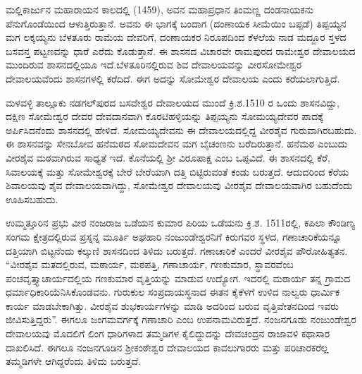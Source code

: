 ಮಲ್ಲಿಕಾರ್ಜುನ ಮಹಾರಾಯನ ಕಾಲದಲ್ಲಿ (1459), ಅವನ ಮಹಾಪ್ರಧಾನ ತಿಂಮಣ್ಣ ದಂಡನಾಯಕನು ಪೆನುಗೊಂಡೆಯಿಂದ ಆಳುತ್ತಿರುತ್ತಾನೆ. ಅವನು ಈ ಭಾಗಕ್ಕೆ ಬಂದಾಗ (ದಂಣಾಯಕ ಸೀಮೆಯಿಂ ಬಪ್ಪಡೆ) ತಿಪ್ಪಯ್ಯನ ಮಗ ಲಕ್ಕಯ್ಯನು ಬೆಳತೂರು ರಾಮೆಯ ದೇವರಿಗೆ, ದಂಣಾಯಕರ ನಿರೂಪದಿಂದ ಕೆಳಲೆಯ ನಾಡ ಮದ್ದೂರ ಸ್ತಳದ ಬಸವನ್ತ ಪಟ್ಟಣವನ್ನು ಧಾರೆ ಎರೆದು ಕೊಡುತ್ತಾನೆ. ಈ ಶಾಸನದ ವಿಚಾರವೇ ರಾಮಪುರದ ರಾಮೇಶ್ವರ ದೇವಾಲಯದ ಮುಂದಿರುವ ಶಾಸನದಲ್ಲಿಯೂ ಇದೆ.ಬೆಳತೂರಿನಲ್ಲಿರುವ ಶಿವ ದೇವಾಲಯವನ್ನು ವೀರಸೋಮೇಶ್ವರ ದೇವಾಲಯವೆಂದು ಶಾಸನಗಳಲ್ಲಿ ಕರೆದಿದೆ. ಈಗ ಅದನ್ನು ಸೋಮೇಶ್ವರ ದೇವಾಲಯ ಎಂದು ಕರೆಯಲಾಗುತ್ತಿದೆ.

ಮಳವಳ್ಳಿ ತಾಲ್ಲೂಕು ನಡಗಲ್​ಪುರದ ಬಸವೇಶ್ವರ ದೇವಾಲಯದ ಮುಂದೆ ಕ್ರಿ.ಶ.1510 ರ ಒಂದು ಶಾಸನವಿದ್ದು, ದಕ್ಷಿಣ ಸೋಮೇಶ್ವರ ದೇವರ ದೇವದಾನವಾಗಿ ಕೊರಟಿಹಳ್ಳಿಯನ್ನು ತಿಪ್ಪಯ್ಯನು ಸೋಮಯ್ಯದೇವರ ಪಾದಕ್ಕೆ ಅರ್ಪಿಸಿದನೆಂದು ಶಾಸನದಲ್ಲಿ ಹೇಳಿದೆ. ಸೋಮಯ್ಯದೇವನು ಈ ದೇವಾಲಯದಲ್ಲಿದ್ದ ವೀರಶೈವ ಗುರುವಾಗಿರಬಹುದು. ಈ ಶಾಸನವನ್ನು ಸೇನಬೋವ ಹನೆಮಠದ ಸೋಮದೇವನ ಮಗ ಬೈಚಂಣನು ಬರೆದಿರುತ್ತಾನೆ. ಹನೆಮಠ ಎಂಬುದು ವೀರಶೈವ ಮಠವಾಗಿರುವ ಸಾಧ್ಯತೆ ಇದೆ. ಕೊನೆಯಲ್ಲಿ ಶ‍್ರೀ ವಿರೂಪಾಕ್ಷ ಎಂಬ ಒಪ್ಪವಿದೆ. ಈ ಶಾಸನದಲ್ಲಿ ಕೆರೆ, ಸಿವಾಲಯಕ್ಕೆ ಮತ್ತು ಸೋಮೇಶ್ವರಕ್ಕೆ ಬೇರೆ ಬೇರೆಯಾಗಿ ದತ್ತಿ ಬಿಟ್ಟಿರುವಂತೆ ಕಂಡು ಬರುತ್ತದೆ. ಆದುದರಿಂದ ಕೆರೆಯ ಶಿವಾಲಯವು ಶೈವ ದೇವಾಲಯವಾಗಿದ್ದು, ಸೋಮೇಶ್ವರ ದೇವಾಲಯವು ವೀರಶೈವ ದೇವಾಲಯವಾಗಿರ ಬಹುದೆಂದು ಊಹಿಸಬಹುದು.

ಉಮ್ಮತ್ತೂರಿನ ಪ್ರಭು ವೀರ ನಂಜರಾಜ ಒಡೆಯನ ಕುಮಾರ ಪಿರಿಯ ಒಡೆಯನು ಕ್ರಿ.ಶ. 1511ರಲ್ಲಿ, ಕಪಿಲಾ ಕೌಂಡಿಣ್ಯ ಸಂಗಮ ಕ್ಷೇತ್ರದಲ್ಲಿರುವ ಪ್ರಸ್ನನ್ನ ಮೂರ್ತಿ ಅಘಹಾರಿ ನಂಜುಂಡೇಶ್ವರನಿಗೆ ಕಿರುಗವರ ಸ್ಥಳದ, ಗಣಾಚಾರಿಕೆಯನ್ನೂ ದತ್ತಿಯಾಗಿ ಬಿಟ್ಟನೆಂದು ಕಲ್ಕುಣಿ ಶಾಸನದಿಂದ ತಿಳಿದು ಬರುತ್ತದೆ. ಗಣಾಚಾರಿಕೆ ಎಂದರೆ ವೀರಶೈವ ಪೌರೋಹಿತ್ಯತನ. “ವೀರಶೈವ ಮತದಲ್ಲಿರುವ, ಮಠಾರ್ಯ, ಮಠಪತ್ತಿ, ಗಣಾಚಾರ್ಯ, ಗಣಕುಮಾರ, ಸ್ಥಾವರವೆಂಬ ಪಂಚವೃತ್ತ್ಯಾಚಾರ್ಯ\-ದಲ್ಲಿಯ ಗಣಕುಮಾರ ವೃತ್ತಿಯನ್ನು ಮಾಡುವ ಉದ್ಯೋಗ. ಇದರಲ್ಲಿ ಮಠಾರ್ಯ ತನ್ನ ಗ್ರಾಮದ ಧರ್ಮಾಧಿಕಾರಿಯೆನಿಸಿ\-ಕೊಂಡವನು. ಗುರುಕುಲ ಸಂಪ್ರದಾಯಸ್ಥನಾದ ಈತನ ಕೈಕೆಳಗೆ ಉಳಿದ ನಾಲ್ವರು ಧಾರ್ಮಿಕ ಕಾರ್ಯ ಮಾಡಬೇಕಾಗಿತ್ತು. ವೀರಶೈವ ಶುಭಕಾರ್ಯಗಳನ್ನು ಮಾಡಿ ಅದರಿಂದ ಬರುವ ವೃತ್ತಿವೇತನದಿಂದ ಇವರು ಜೀವಿಸುತ್ತಿದ್ದರು”. ಈಗಲೂ ಜಂಗಮವರ್ಗಕ್ಕೆ ಗಣಾಚಾರಿ ಎಂಬ ಉಪನಾಮವಿರುತ್ತದೆ. ನಂಜನಗೂಡು ನಂಜುಂಡೇಶ್ವರ ದೇವಾಲಯವು ಮೊದಲಿಗೆ ಲಿಂಗ ಧಾರಿಗಳಾದ ತಮ್ಮಡಿಗಳ ಕೈಲಿದ್ದುದನ್ನು ದೇವಚಂದ್ರನ ರಾಜಾವಳಿ ಕಥಾಸಾರ ದಾಖಲಿಸಿದೆ. ಈಗಲೂ ನಂಜನಗೂಡಿನ ಶ‍್ರೀಕಂಠೇಶ್ವರ ದೇವಾಲಯದ ಕಾವಲುಗಾರರು ಮತ್ತು ಪರಿಚಾರಕರೆಲ್ಲ ತಮ್ಮಡಿಗಳೇ ಆಗಿದ್ದರೆಂದು ತಿಳಿದು ಬರುತ್ತದೆ.

